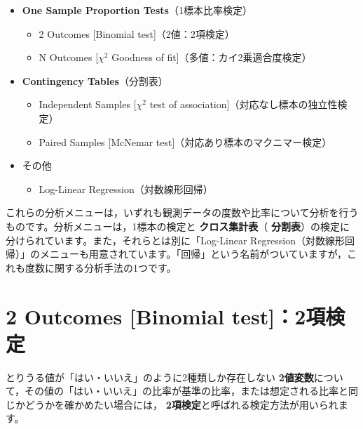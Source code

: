 \documentclass[
  12pt,
  a5jpaper,
  lualatex, ja=standard]{bxjsbook}
\providecommand{\tightlist}{%
  \setlength{\itemsep}{0pt}\setlength{\parskip}{0pt}}
\renewcommand{\emph}[1]{\textbf{\color{emph} #1}}
\newenvironment{jmvmenu}{%
	\begin{center}%
	\begin{tcolorbox}[%
		title=分析メニュー,
		colframe=ao,
		colbacktitle=ao,
		colback=ao!2!white,
		breakable,
		width=.9\textwidth,
		]\small\addtolength{\leftmargini}{-3\labelsep}%
	}%
	{\end{tcolorbox}\end{center}}
\begin{document}
\begin{jmvmenu}

\begin{itemize}
\tightlist
\item
  \textbf{One Sample Proportion Tests}（1標本比率検定）

  \begin{itemize}
  \tightlist
  \item
    2 Outcomes {[}Binomial test{]}（2値：2項検定）
  \item
    N Outcomes {[}\(\chi^{2}\) Goodness of fit{]}（多値：カイ2乗適合度検定）
  \end{itemize}
\item
  \textbf{Contingency Tables}（分割表）

  \begin{itemize}
  \tightlist
  \item
    Independent Samples {[}\(\chi^{2}\) test of association{]}（対応なし標本の独立性検定）
  \item
    Paired Samples {[}McNemar test{]}（対応あり標本のマクニマー検定）
  \end{itemize}
\item
  その他

  \begin{itemize}
  \tightlist
  \item
    Log-Linear Regression（対数線形回帰）
  \end{itemize}
\end{itemize}

\end{jmvmenu}

これらの分析メニューは，いずれも観測データの度数や比率について分析を行うものです。分析メニューは，1標本の検定と\emph{クロス集計表}（\emph{分割表}）の検定に分けられています。また，それらとは別に「Log-Linear Regression（対数線形回帰）」のメニューも用意されています。「回帰」という名前がついていますが，これも度数に関する分析手法の1つです。

\hypertarget{sec:frequencies-binomial}{%
\section{2 Outcomes {[}Binomial test{]}：2項検定}\label{sec:frequencies-binomial}}

とりうる値が「はい・いいえ」のように2種類しか存在しない\emph{2値変数}について，その値の「はい・いいえ」の比率が基準の比率，または想定される比率と同じかどうかを確かめたい場合には，\emph{2項検定}と呼ばれる検定方法が用いられます。
\end{document}
